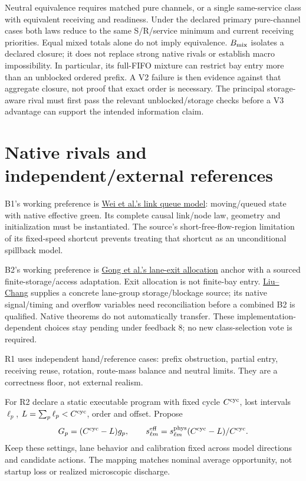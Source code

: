 \documentclass[10pt,a4paper]{article}
\begin{document}
Neutral equivalence requires matched pure channels, or a single same-service
class with equivalent receiving and readiness. Under the declared primary
pure-channel cases both laws reduce to the same S/R/service minimum and
current receiving priorities. Equal mixed totals alone do not imply
equivalence. $B_{\rm mix}$ isolates a declared closure; it does not replace
strong native rivals or establish macro impossibility.
In particular, its full-FIFO mixture can restrict bay entry more than an
unblocked ordered prefix. A V2 failure is then evidence against that
aggregate closure, not proof that exact order is necessary. The principal
storage-aware rival must first pass the relevant unblocked/storage checks
before a V3 advantage can support the intended information claim.

\section{Native rivals and independent/external references}

B1's working preference is
\href{https://arxiv.org/html/2310.12249v2}{Wei et al.'s link queue model}: moving/queued
state with native effective green. Its complete causal link/node law,
geometry and initialization must be instantiated. The source's
short-free-flow-region limitation of its fixed-speed shortcut prevents
treating that shortcut as an unconditional spillback model.

B2's working preference is
\href{https://www.sciencedirect.com/science/article/pii/S0191261525000578}
{Gong et al.'s lane-exit allocation} anchor with a
sourced finite-storage/access adaptation. Exit allocation is not finite-bay
entry. \href{https://attap.umd.edu/wp-content/uploads/2022/05/TRC522.pdf}
{Liu--Chang} supplies a concrete lane-group storage/blockage source;
its native signal/timing and overflow variables need reconciliation before
a combined B2 is qualified. Native theorems do not automatically transfer.
These implementation-dependent choices stay pending under feedback 8;
no new class-selection vote is required.

R1 uses independent hand/reference cases: prefix obstruction, partial entry,
receiving reuse, rotation, route-mass balance and neutral limits. They are a
correctness floor, not external realism.

For R2 declare a static executable program with fixed cycle $C^{\rm cyc}$,
lost intervals $\ell_p$, $L=\sum_p\ell_p<C^{\rm cyc}$, order and offset. Propose
\begin{equation}
 G_p=(C^{\rm cyc}-L)g_p,\qquad
 s^{\rm eff}_{\ell m}=s^{\rm phys}_{\ell m}
                    (C^{\rm cyc}-L)/C^{\rm cyc}.
 \label{eq:sumo-map-new}
\end{equation}
Keep these settings, lane behavior and calibration fixed across model
directions and candidate actions. The mapping matches nominal average
opportunity, not startup loss or realized microscopic discharge.
\end{document}
